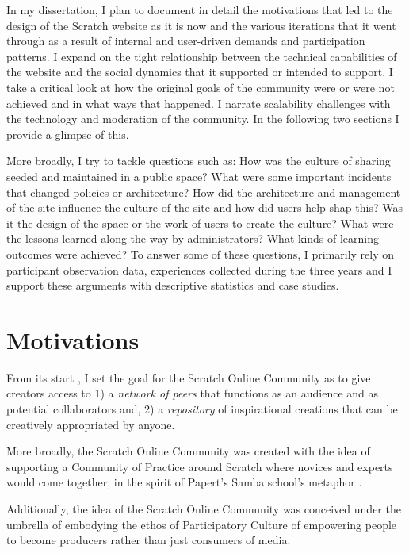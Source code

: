 In my dissertation, I plan to document in detail the motivations that led to the design of the Scratch website as it is now and the various iterations that it went through as a result of internal and user-driven demands and participation patterns.
I expand on the tight relationship between the technical capabilities of the website and the social dynamics that it supported or intended to support.
I take a critical look at how the original goals of the community were or were not achieved and in what ways that happened. 
I narrate scalability challenges with the technology and moderation of the community.
In the following two sections I provide a glimpse of this.

More broadly, I try to tackle questions such as: How was the culture of sharing seeded and maintained in a public space? What were some important incidents that changed policies or architecture? How did the architecture and management of the site influence the culture of the site and how did users help shap this? 
Was it the design of the space or the work of users to create the culture?
 What were the lessons learned along the way by administrators? What kinds of learning outcomes were achieved?
To answer some of these questions, I primarily rely on participant observation data, experiences collected during the three years and I support these arguments with descriptive statistics and case studies.


\section{Motivations}

From its start \citep{monroy-hernandez_scratchr:_2007,monroy-hernandez_empowering_2008}, I set the goal for the Scratch Online Community as to give creators access to 
1) a \emph{network of peers} that functions as an audience and as potential collaborators and,
2) a \emph{repository} of inspirational creations that can be creatively appropriated by anyone.

More broadly, the Scratch Online Community was created with the idea of supporting a Community of Practice around Scratch where novices and experts would come together,  in the spirit of Papert's Samba school's metaphor \citep{papert_mindstorms_1980}.

Additionally, the idea of the Scratch Online Community was conceived under the umbrella of embodying the ethos of Participatory Culture of empowering people to become producers rather than just consumers of media.


